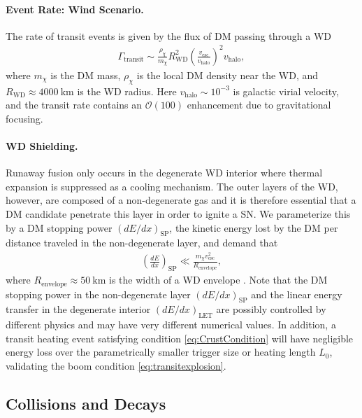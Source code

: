 \documentclass[preprintnumbers,amsmath,amssymb,prd,superscriptaddress]{revtex4}
\newcommand{\OO}{\mathcal{O}}
\def\r{\right)}
\def\l{\left(}
\begin{document}
\paragraph{Event Rate: Wind Scenario.}
The rate of transit events is given by the flux of DM passing through a WD
\begin{align}
  \Gamma_\text{transit} \sim
  \frac{\rho_{\chi}}{m_\chi} R_\text{WD}^2
  \l\frac{v_\text{esc}}{v_\text{halo}}\r^2 v_\text{halo},
\label{eq:TransitFluxCondition}
\end{align}
where $m_\chi$ is the DM mass, $\rho_\chi$ is the local DM density near the WD, and $R_\text{WD} \approx 4000 ~\text{km}$ is the WD radius.
Here $v_\text{halo} \sim 10^{-3}$ is galactic virial velocity, and the transit rate contains an $\OO(100)$ enhancement due to gravitational focusing.

\paragraph{WD Shielding.}
Runaway fusion only occurs in the degenerate WD interior where thermal expansion is suppressed as a cooling mechanism.
The outer layers of the WD, however, are composed of a non-degenerate gas and it is therefore essential that a DM candidate penetrate this layer in order to ignite a SN.
We parameterize this by a DM stopping power $(dE/dx)_\text{SP}$, the kinetic energy lost by the DM per distance traveled in the non-degenerate layer, and demand that
\begin{align}
\label{eq:CrustCondition}
  \left( \frac{d E}{d x} \right)_\text{SP} \ll
  \frac{m_\chi v^2_\text{esc}}{R_\text{envelope}},
\end{align}
where $R_\text{envelope} \approx 50 ~\text{km}$ is the width of a WD envelope \cite{KippenhahnWeigert}.
Note that the DM stopping power in the non-degenerate layer $(dE/dx)_\text{SP}$ and the linear energy transfer in the degenerate interior $(dE/dx)_\text{LET}$ are possibly controlled by different physics and may have very different numerical values.
In addition, a transit heating event satisfying condition \eqref{eq:CrustCondition} will have negligible energy loss over the parametrically smaller trigger size or heating length $L_0$, validating the boom condition \eqref{eq:transitexplosion}.

\subsection{Collisions and Decays}
\end{document}
